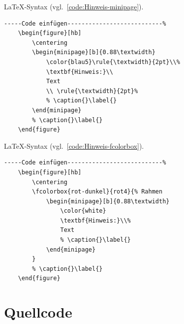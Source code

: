 \LaTeX -Syntax (vgl.~\ref{code:Hinweis-minipage}). 

\begin{lstlisting}[caption={Hinweis in minipage},label={code:Hinweis-minipage},language=TeX% C, TeX, Bash, Python
]-----Code einfügen---------------------------%
	\begin{figure}[hb]
		\centering
		\begin{minipage}[b]{0.88\textwidth} 
			\color{blau5}\rule{\textwidth}{2pt}\\%
			\textbf{Hinweis:}\\
			Text
			\\ \rule{\textwidth}{2pt}%
			% \caption{}\label{}
		\end{minipage}
		% \caption{}\label{}
	\end{figure}
\end{lstlisting}

\begin{figure}[hb]
	\centering
\end{figure}

\LaTeX -Syntax (vgl.~\ref{code:Hinweis-fcolorbox}). 

\begin{lstlisting}[caption={Hinweis in fcolorbox},label={code:Hinweis-fcolorbox},language=TeX% C, TeX, Bash, Python
]-----Code einfügen---------------------------%
	\begin{figure}[hb]
		\centering
		\fcolorbox{rot-dunkel}{rot4}{% Rahmen
			\begin{minipage}[b]{0.88\textwidth} 
				\color{white}
				\textbf{Hinweis:}\\%
				Text
				% \caption{}\label{}
			\end{minipage}
		}
		% \caption{}\label{}
	\end{figure}
\end{lstlisting}

\clearpage
\section{Quellcode}

